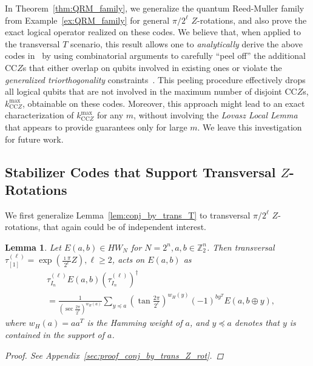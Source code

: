 \documentclass[twoside,romanappendices]{IEEEtran}
\newtheorem{lemma}[theorem]{Lemma}
\begin{document}
In Theorem~\ref{thm:QRM_family}, we generalize the quantum Reed-Muller family from Example~\ref{ex:QRM_family} for general $\pi/2^{\ell}$ $Z$-rotations, and also prove the exact logical operator realized on these codes.
We believe that, when applied to the transversal $T$ scenario, this result allows one to \emph{analytically} derive the above codes in~\cite{Haah-quantum17b} by using combinatorial arguments to carefully ``peel off'' the additional CC$Z$s that either overlap on qubits involved in existing ones or violate the \emph{generalized triorthogonality} constraints~\cite{Haah-quantum17b}.
This peeling procedure effectively drops all logical qubits that are not involved in the maximum number of disjoint CC$Z$s, $k_{\text{CC}Z}^{\text{max}}$, obtainable on these codes.
Moreover, this approach might lead to an exact characterization of $k_{\text{CC}Z}^{\text{max}}$ for any $m$, without involving the \emph{Lovasz Local Lemma} that appears to provide guarantees only for large $m$.
We leave this investigation for future work.




\subsection{Stabilizer Codes that Support Transversal $Z$-Rotations}
\label{sec:stab_codes_Z_rotations}


We first generalize Lemma~\ref{lem:conj_by_trans_T} to transversal $\pi/2^{\ell}$ $Z$-rotations, that again could be of independent interest. %


\begin{lemma}
\label{lem:conj_by_trans_Z_rot}
Let $E(a,b) \in HW_N$ for $N = 2^n, a,b \in \mathbb{Z}_2^n$.
Then transversal $\tau_{[ 1 ]}^{(\ell)} = \exp\left( \frac{\imath\pi}{2^{\ell}} Z \right), \ell \geq 2$, acts on $E(a,b)$ as
\begin{align}
& \tau_{I_n}^{(\ell)} E(a,b) \left( \tau_{I_n}^{(\ell)} \right)^{\dagger} \nonumber \\
%
  & = \frac{1}{\left( \sec\frac{2\pi}{2^{\ell}} \right)^{w_H(a)}} \sum_{y \preceq a} \left( \tan\frac{2\pi}{2^{\ell}} \right)^{w_H(y)} (-1)^{b y^T} E(a, b \oplus y),
\end{align}
where $w_H(a) = aa^T$ is the Hamming weight of $a$, and $y \preceq a$ denotes that $y$ is contained in the support of $a$.
\begin{proof}
See Appendix~\ref{sec:proof_conj_by_trans_Z_rot}.
\end{proof}
\end{lemma}
\end{document}
